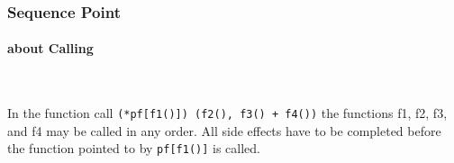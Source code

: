 

\subsubsection{Sequence Point}

\paragraph{about Calling} \

In the function call \verb`(*pf[f1()]) (f2(), f3() + f4())` the functions f1, f2, f3, and f4 may be called in any order. All side effects have to be completed before the function pointed to by \verb`pf[f1()]` is called.
